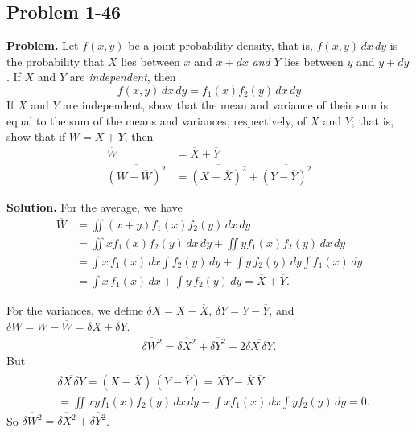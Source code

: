 \documentclass[twocolumn, 10pt]{article}
\numberwithin{equation}{section}
\newenvironment{problem}
{\par\medskip\sffamily \color{problue}
  \textbf{Problem. }\ignorespaces}
{\medskip}
\newenvironment{solution}
{\par\medskip
  \textbf{Solution. }\ignorespaces}
{\medskip}
\begin{document}
\subsection{Problem 1-46}

\begin{problem}
  Let $f(x, y)$ be a joint probability density,
  that is, $f(x, y)\, dx \, dy$
  is the probability that $X$ lies between $x$ and $x+dx$
  \emph{and}
  $Y$ lies between $y$ and $y + dy$.
  If $X$ and $Y$ are \emph{independent}, then
  $$
  f(x, y) \, dx \, dy = f_1(x) f_2(y) \, dx \, dy
  $$
  If $X$ and $Y$ are independent, show that the mean and variance
  of their sum is equal to the sum of the means and variances, respectively,
  of $X$ and $Y$;
  that is, show that if $W = X + Y$, then
  \begin{align*}
    \overline W &= \overline X + \overline Y \\
    \overline{ (W - \overline W)^2 } &=
    \overline{ (X - \overline X)^2 } +
    \overline{ (Y - \overline Y)^2 }
  \end{align*}
\end{problem}

\begin{solution}
  For the average, we have
  \begin{align*}
    \overline W
    &=
    \iint (x + y) f_1(x) f_2(y) \, dx \, dy
    \\
    &=
    \iint x f_1(x) f_2(y) \, dx \, dy
    +
    \iint y f_1(x) f_2(y) \, dx \, dy
    \\
    &=
    \int x \, f_1(x) \, dx \int f_2(y) \, dy
    +
    \int y \, f_2(y) \, dy \int f_1(x) \, dy
    \\
    &=
    \int x \, f_1(x) \, dx
    +
    \int y \, f_2(y) \, dy
    =
    \overline X + \overline Y.
  \end{align*}

  For the variances,
  we define
  $\delta X = X - \overline X$,
  $\delta Y = Y - \overline Y$,
  and
  $\delta W = W - \overline W = \delta X + \delta Y$.
  \begin{align*}
    \overline{ \delta W^2 }
    =
    \overline{ \delta X^2 }
    +
    \overline{ \delta Y^2 }
    +
    2 \overline{ \delta X \, \delta Y }.
  \end{align*}
  But
  \begin{align*}
    &\overline{ \delta X \, \delta Y }
    =
    \overline{ (X - \overline X) \, (Y - \overline Y) }
    =
    \overline{ X Y }
    - \overline X \, \overline Y
    \\
    &=
    \iint x y f_1(x) f_2(y) \, dx \, dy
    -
    \int x f_1(x) \, dx \int y f_2(y) \, dy
    = 0.
  \end{align*}
  So
    $\overline{ \delta W^2 }
    =
    \overline{ \delta X^2 }
    +
    \overline{ \delta Y^2 }$.
\end{solution}
\end{document}
